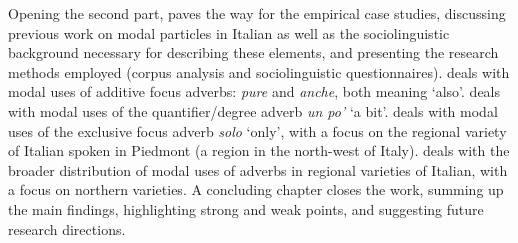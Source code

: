 Opening the second part,  paves the way for the empirical case studies, discussing previous work on modal particles in Italian as well as the sociolinguistic background necessary for describing these elements, and presenting the research methods employed (corpus analysis and sociolinguistic questionnaires).  deals with modal uses of additive focus adverbs: \textit{pure} and \textit{anche}, both meaning ‘also’.  deals with modal uses of the quantifier/degree adverb \textit{un po’} ‘a bit’.  deals with modal uses of the exclusive focus adverb \textit{solo} ‘only’, with a focus on the regional variety of Italian spoken in Piedmont (a region in the north-west of Italy).  deals with the broader distribution of modal uses of adverbs in regional varieties of Italian, with a focus on northern varieties. A concluding chapter closes the work, summing up the main findings, highlighting strong and weak points, and suggesting future research directions.

